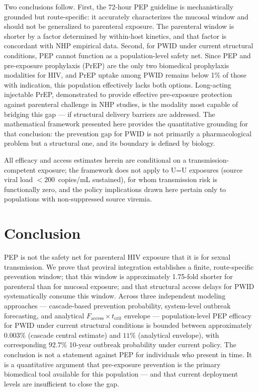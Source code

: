 \documentclass[11pt]{article}
\theoremstyle{definition}
\theoremstyle{remark}
\newcommand{\Faccess}{F_{\text{access}}}
\newcommand{\tcrit}{t_{\text{crit}}}
\begin{document}
Two conclusions follow. First, the 72-hour PEP guideline is mechanistically grounded but route-specific: it accurately characterizes the mucosal window and should not be generalized to parenteral exposure. The parenteral window is shorter by a factor determined by within-host kinetics, and that factor is concordant with NHP empirical data. Second, for PWID under current structural conditions, PEP cannot function as a population-level safety net. Since PEP and pre-exposure prophylaxis (PrEP) are the only two biomedical prophylaxis modalities for HIV\cite{grant2010,anderson2012}, and PrEP uptake among PWID remains below 1\% of those with indication\cite{baugher2025}, this population effectively lacks both options. Long-acting injectable PrEP, demonstrated to provide effective pre-exposure protection against parenteral challenge in NHP studies\cite{swanstrom2023,vidal2022}, is the modality most capable of bridging this gap --- if structural delivery barriers are addressed\cite{demidont2026}. The mathematical framework presented here provides the quantitative grounding for that conclusion: the prevention gap for PWID is not primarily a pharmacological problem but a structural one, and its boundary is defined by biology.

All efficacy and access estimates herein are conditional on a transmission-competent exposure; the framework does not apply to U=U exposures (source viral load $<200$~copies/mL sustained), for whom transmission risk is functionally zero, and the policy implications drawn here pertain only to populations with non-suppressed source viremia.

\section*{Conclusion}

PEP is not the safety net for parenteral HIV exposure that it is for sexual transmission. We prove that proviral integration establishes a finite, route-specific prevention window; that this window is approximately 1.75-fold shorter for parenteral than for mucosal exposure; and that structural access delays for PWID systematically consume this window. Across three independent modeling approaches --- cascade-based prevention probability, system-level outbreak forecasting, and analytical $\Faccess \times \tcrit$ envelope --- population-level PEP efficacy for PWID under current structural conditions is bounded between approximately $0.003\%$ (cascade central estimate) and $11\%$ (analytical envelope), with corresponding $92.7\%$ 10-year outbreak probability under current policy. The conclusion is not a statement against PEP for individuals who present in time. It is a quantitative argument that pre-exposure prevention is the primary biomedical tool available for this population --- and that current deployment levels are insufficient to close the gap.
\end{document}
